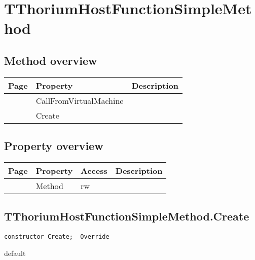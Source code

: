 \section{TThoriumHostFunctionSimpleMethod}
\label{thoriumcore:thorium:tthoriumhostfunctionsimplemethod}
\subsection{Method overview}
\label{thoriumcore:thorium:tthoriumhostfunctionsimplemethod:methods}
\begin{tabularx}{\textwidth}{llX}
Page & Property & Description  \\ \hline
\pageref{thoriumcore:thorium:tthoriumhostfunctionsimplemethod:callfromvirtualmachine} & CallFromVirtualMachine  &  \\
\pageref{thoriumcore:thorium:tthoriumhostfunctionsimplemethod:create} & Create  &  \\
\hline
\end{tabularx}
\subsection{Property overview}
\label{thoriumcore:thorium:tthoriumhostfunctionsimplemethod:properties}
\begin{tabularx}{\textwidth}{lllX}
Page & Property & Access & Description \\ \hline
\pageref{thoriumcore:thorium:tthoriumhostfunctionsimplemethod:method} & Method & rw &  \\
\hline
\end{tabularx}
\subsection{TThoriumHostFunctionSimpleMethod.Create}
\label{thoriumcore:thorium:tthoriumhostfunctionsimplemethod:create}
\begin{FPCList}
\Synopsis
\Declaration 

\begin{verbatim}
constructor Create;  Override
\end{verbatim}
\Visibility
default
\Description
\Errors
\end{FPCList}
